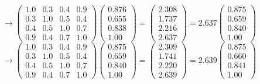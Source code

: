 \documentclass{ltjsbook}
\begin{document}
$$\to\left( \begin{array}{cccc} 1.0 & 0.3 & 0.4 & 0.9\\ 0.3 & 1.0 & 0.5 & 0.4\\  0.4 & 0.5 & 1.0 & 0.7\\ 0.9 & 0.4 & 0.7 & 1.0 \end{array} \right) \left( \begin{array}{c} 0.876\\ 0.655\\ 0.838\\ 1.00 \end{array} \right)=\left( \begin{array}{c} 2.308\\ 1.737\\ 2.216\\ 2.637 \end{array} \right)=2.637\left( \begin{array}{c} 0.875\\ 0.659\\ 0.840\\ 1.00 \end{array} \right)$$
$$\to\left( \begin{array}{cccc} 1.0 & 0.3 & 0.4 & 0.9\\ 0.3 & 1.0 & 0.5 & 0.4\\  0.4 & 0.5 & 1.0 & 0.7\\ 0.9 & 0.4 & 0.7 & 1.0 \end{array} \right) \left( \begin{array}{c} 0.875\\ 0.659\\ 0.840\\ 1.00 \end{array} \right)=\left( \begin{array}{c} 2.309\\ 1.741\\ 2.220\\ 2.639 \end{array} \right)=2.639\left( \begin{array}{c} 0.875\\ 0.660\\ 0.841\\ 1.00 \end{array} \right)$$
\end{document}
